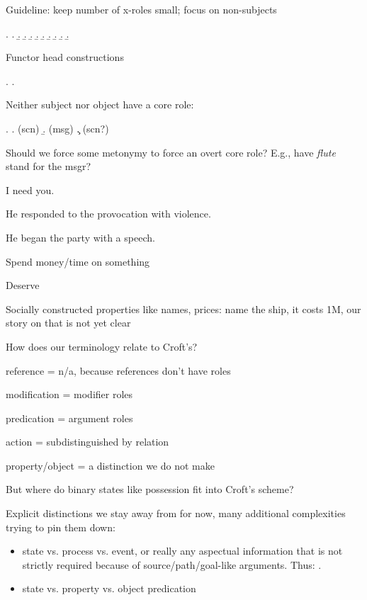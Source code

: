 \documentclass[a4paper]{article}
\begin{document}
Guideline: keep number of x-roles small; focus on non-subjects

\ex.
\a. 
\b. 
\b. 
\b. 
\b. 
\b. 
\b. 
\b. 
\b. 
\b. 

Functor head constructions

\ex. \a. 

Neither subject nor object have a core role:

\ex. \a.  (scn)
     \b.  (msg)
     \c.  (scn?)

Should we force some metonymy to force an overt core role? E.g., have \emph{flute} stand for the msgr?

I need you.

He responded to the provocation with violence.

He began the party with a speech.

Spend money/time on something

Deserve

Socially constructed properties like names, prices: name the ship, it costs 1M, our story on that is not yet clear

How does our terminology relate to Croft's?

reference = n/a, because references don't have roles

modification = modifier roles

predication = argument roles

action = subdistinguished by relation

property/object = a distinction we do not make

But where do binary states like possession fit into Croft's scheme?

Explicit distinctions we stay away from for now, many additional complexities
trying to pin them down:

\begin{itemize}
    \item state vs. process vs. event, or really any aspectual information that
        is not strictly required because of source/path/goal-like arguments.
        Thus: .
    \item state vs. property vs. object predication
\end{itemize}
\end{document}
